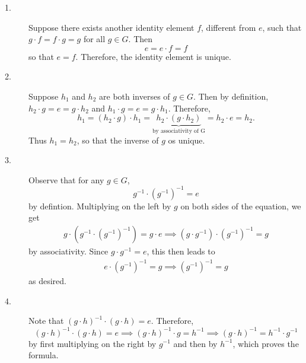 \begin{prf}
    \begin{description}
        \item[1.] Suppose there exists another identity 
        element $f$, different from $e$, such that
        $g \cdot f = f \cdot g = g$ for all $g \in G$. Then 
        \[
            e = e \cdot f = f
        \]
        so that $e = f$. Therefore, the identity element is unique.

        \item[2.] Suppose $h_1$ and $h_2$ are both inverses of $g \in
        G$. Then by definition, $h_2 \cdot g = e = g \cdot h_2$ and $h_1 \cdot g = e
        = g \cdot h_1$. Therefore, 
        \[
            h_1 = (h_2 \cdot g) \cdot h_1 = \underbrace{h_2 \cdot (g \cdot h_2)}_{\text{by associativity of G}}
            = h_2 \cdot e = h_2.
        \]
        Thus $h_1 = h_2$, so that the inverse of $g$ os unique. 

        \item[3.] Observe that for any $g \in G$,
        \[
            g^{-1}\cdot (g^{-1})^{-1} = e
        \]
        by defintion. Multiplying on the left by $g$ on both sides of
        the equation, we get 
        \begin{align*}
            g \cdot (g^{-1} \cdot (g^{-1})^{-1}) = g \cdot e
            \implies (g \cdot g^{-1}) \cdot (g^{-1})^{-1} = g 
        \end{align*}
        by associativity. Since $g \cdot g^{-1} = e$, this then leads to 
        \begin{align*}
            e \cdot (g^{-1})^{-1} = g \implies (g^{-1})^{-1} = g
        \end{align*}
        as desired.

        \item[4.] Note that $(g \cdot h)^{-1} \cdot (g \cdot h) = e.$
        Therefore,
        \[
            (g \cdot h)^{-1} \cdot (g \cdot h) = e \implies (g \cdot h)^{-1} \cdot g = h^{-1}
            \implies (g \cdot h)^{-1} = h^{-1} \cdot g^{-1}
        \] 
        by first multiplying on the right by $g^{-1}$ and then by
        $h^{-1}$, which proves the formula.


\end{description}
\end{prf}
